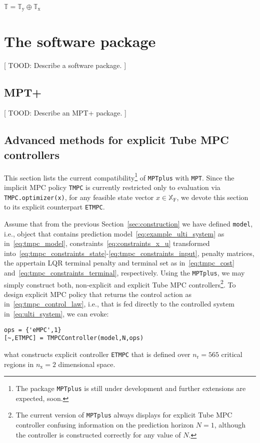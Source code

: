 \documentclass[letterpaper, 10 pt, conference]{ieeeconf}
\begin{document}
$\mathbb{T} = \mathbb{T}_{\mathrm{y}} \oplus \mathbb{T}_{\mathrm{x}}$


\section{The software package}
\label{sec:code}

[ TOOD: Describe a software package. ]

\subsection{MPT+}
\label{sec:code_mptplus}

[ TOOD: Describe an MPT+ package. ]

\subsection{Advanced methods for explicit Tube MPC controllers}
\label{sec:advanced_method}

This section lists the current compatibility\footnote{The package \texttt{MPTplus} is still under development and further extensions are expected, soon.} of \texttt{MPTplus} with \texttt{MPT}. 
%
Since the implicit MPC policy \verb|TMPC| is currently restricted only to evaluation via \verb|TMPC.optimizer(x)|, for any feasible state vector $x\in\mathbb{X}_{\mathrm{F}}$, we devote this section to its explicit counterpart \verb|ETMPC|.

Assume that from the previous Section~\ref{sec:construction} we have defined \verb|model|, i.e., object that contains prediction model~\eqref{eq:example_ulti_system} as in~\eqref{eq:tmpc_model}, constraints~\eqref{eq:constraints_x_u} transformed into~\eqref{eq:tmpc_constraints_state}-\eqref{eq:tmpc_constraints_input}, penalty matrices, the appertain LQR terminal penalty and terminal set as in~\eqref{eq:tmpc_cost} and~\eqref{eq:tmpc_constraints_terminal}, respectively. 
%
Using the \texttt{MPTplus}, we may simply construct both, non-explicit and explicit Tube MPC controllers\footnote{The current version of \texttt{MPTplus} always displays for explicit Tube MPC controller confusing information on the prediction horizon $N=1$, although the controller is constructed correctly for any value of $N$.}. To design explicit MPC policy that returns the control action as in~\eqref{eq:tmpc_control_law}, i.e., that is fed directly to the controlled system in~\eqref{eq:ulti_system}, we can evoke:
\begin{lstlisting}[style=Matlab-editor]
ops = {'eMPC',1}
[~,ETMPC] = TMPCController(model,N,ops)
\end{lstlisting}
what constructs explicit controller \verb|ETMPC| that is defined over $n_\text{r} = 565$ critical regions in $n_\text{x} = 2$ dimensional space.
\end{document}
